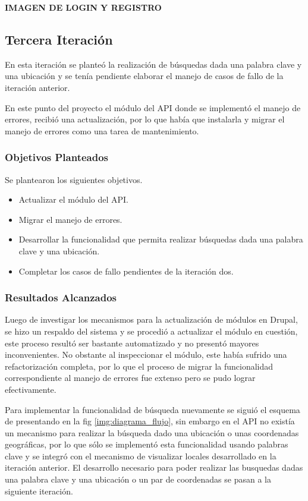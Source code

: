   \textbf{IMAGEN DE LOGIN Y REGISTRO}
\subsection{Tercera Iteración}

En esta iteración se planteó la realización de búsquedas dada una palabra clave y una ubicación y se tenía pendiente elaborar el manejo de casos de fallo de la iteración anterior.

En este punto del proyecto el módulo del API donde se implementó el manejo de errores, recibió una actualización, por lo que había que instalarla y migrar el manejo de errores como una tarea de mantenimiento.

\subsubsection{Objetivos Planteados} 
Se plantearon los siguientes objetivos.
\begin{itemize}
\item Actualizar el módulo del API.
\item Migrar el manejo de errores.
\item Desarrollar la funcionalidad que permita realizar búsquedas dada una palabra clave y una ubicación.
\item Completar los casos de fallo pendientes de la iteración dos.
\end{itemize}

\subsubsection{Resultados Alcanzados}

Luego de investigar los mecanismos para la actualización de módulos en Drupal, se hizo un respaldo del sistema y se procedió a actualizar el módulo en cuestión, este proceso resultó ser bastante automatizado y no presentó mayores inconvenientes. No obstante al inspeccionar el módulo, este había sufrido una refactorización completa, por lo que el proceso de migrar la funcionalidad correspondiente al manejo de errores fue extenso pero se pudo lograr efectivamente.

Para implementar la funcionalidad de búsqueda nuevamente se siguió el esquema de presentando en la fig \ref{img:diagrama_flujo}, sin embargo en el API no existía un mecanismo para realizar la búsqueda dado una ubicación o unas coordenadas geográficas, por lo que sólo se implementó esta funcionalidad usando palabras clave y se integró con el mecanismo de visualizar locales desarrollado en la iteración anterior. El desarrollo necesario para poder realizar las busquedas dadas una palabra clave y una ubicación o un par de coordenadas se pasan a la siguiente iteración.


